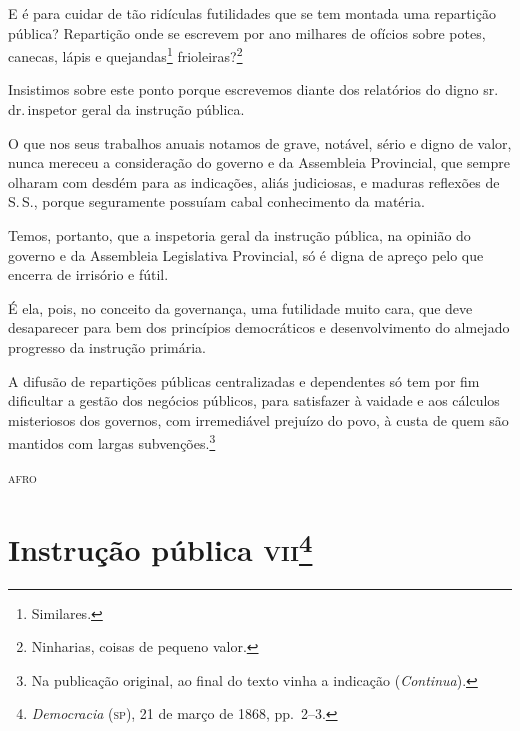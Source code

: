 E é para cuidar de tão ridículas futilidades que se tem montada uma
repartição pública? Repartição onde se escrevem por ano milhares de
ofícios sobre potes, canecas, lápis e quejandas\footnote{Similares.}
frioleiras?\footnote{Ninharias, coisas de pequeno valor.}

Insistimos sobre este ponto porque escrevemos diante dos relatórios do
digno sr.\,dr.\,inspetor geral da instrução pública.

O que nos seus trabalhos anuais notamos de grave, notável, sério e digno
de valor, nunca mereceu a consideração do governo e da Assembleia
Provincial, que sempre olharam com desdém para as indicações, aliás
judiciosas, e maduras reflexões de S.\,S., porque seguramente possuíam
cabal conhecimento da matéria.

Temos, portanto, que a inspetoria geral da instrução pública, na opinião
do governo e da Assembleia Legislativa Provincial, só é digna de apreço
pelo que encerra de irrisório e fútil.

É ela, pois, no conceito da governança, uma futilidade muito cara, que
deve desaparecer para bem dos princípios democráticos e desenvolvimento
do almejado progresso da instrução primária.

A difusão de repartições públicas centralizadas e dependentes só tem por
fim dificultar a gestão dos negócios públicos, para satisfazer à vaidade
e aos cálculos misteriosos dos governos, com irremediável prejuízo do
povo, à custa de quem são mantidos com largas subvenções.\footnote{Na publicação original, ao final do texto vinha a indicação (\emph{Continua}).}

\begin{flushright}
\textsc{afro}
\end{flushright}

\chapter{Instrução pública \textsc{vii}\footnote{\emph{Democracia} (\textsc{sp}),
  21 de março de 1868, pp.~2--3.}} %

